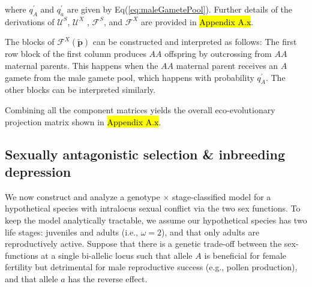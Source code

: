 \documentclass[11pt]{article}
\def\mbf#1{\mathbf{#1}}
\def\mcal#1{\mathcal{#1}}
\begin{document}
\noindent where $q^{\prime}_A$ and $q^{\prime}_a$ are given by Eq(\ref{eq:maleGametePool}). Further details of the derivations of $\mcal{U}^S$, $\mcal{U}^X$ ,  $\mcal{F}^S$, and $\mcal{F}^X$ are provided in \hl{Appendix A.x}. 

The blocks of $\mcal{F}^X(\tilde{\mbf{p}})$ can be constructed and interpreted as follows: The first row block of the first column produces $AA$ offspring by outcrossing from $AA$ maternal parents. This happens when the $AA$ maternal parent receives an $A$ gamete from the male gamete pool, which happens with probability $q^{\prime}_{A}$. The other blocks can be interpreted similarly.

Combining all the component matrices yields the overall eco-evolutionary projection matrix shown in \hl{Appendix A.x}.


\subsection{Sexually antagonistic selection \& inbreeding depression} \label{sec:SAsel}

We now construct and analyze a genotype $\times$ stage-classified model for a hypothetical species with intralocus sexual conflict via the two sex functions. To keep the model analytically tractable, we assume our hypothetical species has two life stages: juveniles and adults (i.e., $\omega = 2$), and that only adults are reproductively active. Suppose that there is a genetic trade-off between the sex-functions at a single bi-allelic locus such that allele $A$ is beneficial for female fertility but detrimental for male reproductive success (e.g., pollen production), and that allele $a$ has the reverse effect. 
\end{document}
